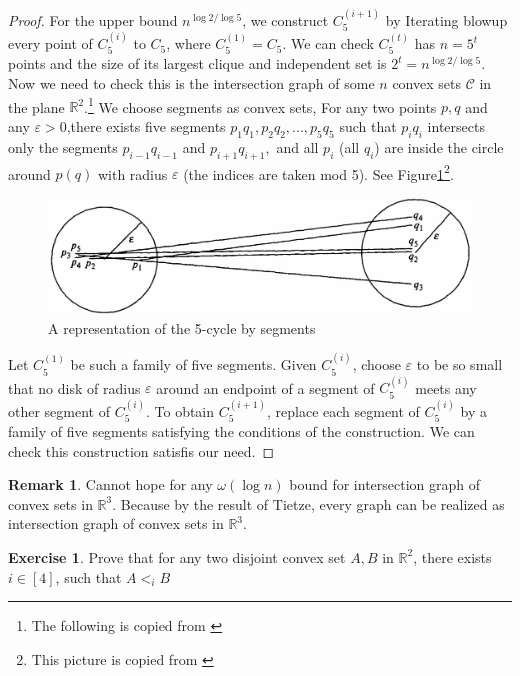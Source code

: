 \documentclass{article}
\theoremstyle{definition}
\newtheorem{remark}[theorem]{Remark}
\newtheorem{exercise}[theorem]{Exercise}
\begin{document}
\begin{proof}
    For the upper bound $n^{\log2/\log5}$, we construct $C_5^{(i+1)}$ by Iterating blowup every point of $C_5^{(i)}$ to $C_5$, where $C_5^{(1)}=C_5$. We can check $C_5^{(t)}$ has $n=5^t$ points and the size of its largest clique and independent set is $2^t=n^{\log2/\log5}.$ Now we need to check this is the intersection graph of some $n$ convex sets $\mathcal{C}$ in the plane $\mathbb{R}^2$.\footnote{The following is copied from \cite{LarmanDavidet1994}} We choose segments as convex sets, For any two points $p,q$ and any $\varepsilon>0$,there exists five segments $p_1q_1,p_2q_2,...,p_5q_5$ such that $p_iq_i$ intersects only the segments $p_{i-1}q_{i-1}$ and $p_{i+1}q_{i+1},$ and all $p_i$ (all $q_i$) are inside the circle around $p(q)$ with radius $\varepsilon$ (the indices are taken mod 5). See Figure\ref{fig:14-2}\footnote{This picture is copied from \cite{LarmanDavidet1994}}.
    \begin{figure}[H]
        \centering
        \includegraphics[scale=0.3]{14-2.png}
        \caption{A representation of the 5-cycle by segments}
        \label{fig:14-2}
    \end{figure}
     Let $C_5^{(1)}$ be such a family of five segments. Given $C_5^{(i)}$, choose $\varepsilon$ to be so small that no disk of radius $\varepsilon$ around an endpoint of a segment of $C_5^{(i)}$ meets any other segment of $C_5^{(i)}$. To obtain $C_5^{(i+1)}$, replace each segment of $C_5^{(i)}$ by a family of five segments satisfying the conditions of the construction. We can check this construction satisfis our need.
\end{proof}

\begin{remark}
    Cannot hope for any $\omega(\log n)$ bound for intersection graph of convex sets in $\mathbb{R}^3.$ Because by the result of Tietze, every graph can be realized as intersection graph of convex sets in $\mathbb{R}^3.$ 
\end{remark}

\begin{exercise}
    Prove that for any two disjoint convex set $A,B$ in $\mathbb{R}^2$, there exists $i\in [4]$, such that $A<_iB$
\end{exercise}
\end{document}
